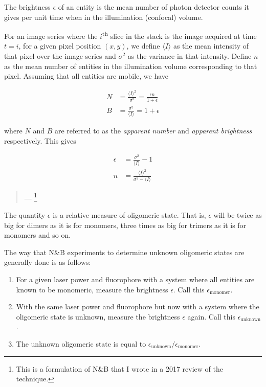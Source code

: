 \documentclass[12pt,]{book}
\providecommand{\tightlist}{%
  \setlength{\itemsep}{0pt}\setlength{\parskip}{0pt}}
\let\rmarkdownfootnote\footnote%
\def\footnote{\protect\rmarkdownfootnote}
\theoremstyle{definition}
\theoremstyle{definition}
\theoremstyle{definition}
\theoremstyle{remark}
\let\BeginKnitrBlock\begin \let\EndKnitrBlock\end
\begin{document}
\BeginKnitrBlock{definition}
\protect\hypertarget{def:unnamed-chunk-14}{}{\label{def:unnamed-chunk-14}
}The brightness \(\epsilon\) of an entity is the mean number of photon
detector counts it gives per unit time when in the illumination
(confocal) volume.
\EndKnitrBlock{definition} For an image series where the
\(i\)\textsuperscript{th} slice in the stack is the image acquired at
time \(t = i\), for a given pixel position \((x, y)\), we define
\(\langle I \rangle\) as the mean intensity of that pixel over the image
series and \(\sigma^2\) as the variance in that intensity. Define \(n\)
as the mean number of entities in the illumination volume corresponding
to that pixel. Assuming that all entities are mobile, we have

\begin{align}
N &= \frac{\langle I \rangle^2}{\sigma^2} = \frac{\epsilon n}{1 + \epsilon} \label{eq:NB1-1} \\
B &= \frac{\sigma^2}{\langle I \rangle} = 1 + \epsilon \label{eq:NB1-2}
\end{align}

where \(N\) and \(B\) are referred to as the \emph{apparent number} and
\emph{apparent brightness} respectively. This gives

\begin{align}
\epsilon &= \frac{\sigma^2}{\langle I \rangle} - 1 \label{eq:NB2-1} \\
n &= \frac{\langle I \rangle^2}{\sigma^2 - \langle I \rangle} \label{eq:NB2-2}
\end{align}

\begin{quote}
--- \citet{NBreview}\footnote{This is a formulation of N\&B that I wrote
  in a 2017 review of the technique.}
\end{quote}

The quantity \(\epsilon\) is a relative measure of oligomeric state.
That is, \(\epsilon\) will be twice as big for dimers as it is for
monomers, three times as big for trimers as it is for monomers and so
on.

The way that N\&B experiments to determine unknown oligomeric states are
generally done is as follows:

\begin{enumerate}
\def\labelenumi{\arabic{enumi}.}
\tightlist
\item
  For a given laser power and fluorophore with a system where all
  entities are known to be monomeric, measure the brightness
  \(\epsilon\). Call this \(\epsilon_\text{monomer}\).
\item
  With the same laser power and fluorophore but now with a system where
  the oligomeric state is unknown, measure the brightness \(\epsilon\)
  again. Call this \(\epsilon_\text{unknown}\).
\item
  The unknown oligomeric state is equal to
  \(\epsilon_\text{unknown} / \epsilon_\text{monomer}\).
\end{enumerate}
\end{document}
